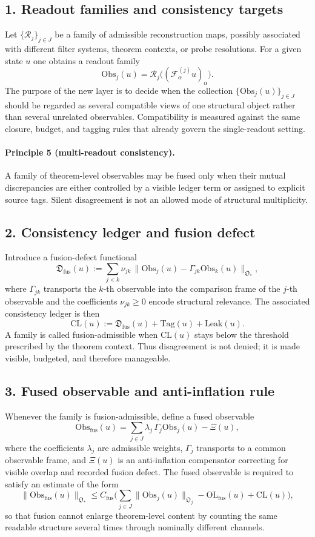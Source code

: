 \subsection*{1. Readout families and consistency targets}
Let $\{\mathcal R_j\}_{j\in J}$ be a family of admissible reconstruction maps,
possibly associated with different filter systems, theorem contexts, or probe
resolutions. For a given state $u$ one obtains a readout family
\[
\mathrm{Obs}_j(u)=\mathcal R_j\bigl((\mathcal F^{(j)}_\alpha u)_\alpha\bigr).
\]
The purpose of the new layer is to decide when the collection
$\{\mathrm{Obs}_j(u)\}_{j\in J}$ should be regarded as several compatible views of one
structural object rather than several unrelated observables. Compatibility is
measured against the same closure, budget, and tagging rules that already govern
the single-readout setting.

\paragraph{Principle 5 (multi-readout consistency).}
A family of theorem-level observables may be fused only when their mutual
discrepancies are either controlled by a visible ledger term or assigned to
explicit source tags. Silent disagreement is not an allowed mode of structural
multiplicity.

\subsection*{2. Consistency ledger and fusion defect}
Introduce a fusion-defect functional
\[
\mathfrak D_{\mathrm{fus}}(u)
:= \sum_{j<k}\nu_{jk}\,\|\mathrm{Obs}_j(u)-\Gamma_{jk}\mathrm{Obs}_k(u)\|_{\mathfrak O_*},
\]
where $\Gamma_{jk}$ transports the $k$-th observable into the comparison frame of the
$j$-th observable and the coefficients $\nu_{jk}\ge 0$ encode structural relevance.
The associated consistency ledger is then
\[
\mathrm{CL}(u):=\mathfrak D_{\mathrm{fus}}(u)+\mathrm{Tag}(u)+\mathrm{Leak}(u).
\]
A family is called fusion-admissible when $\mathrm{CL}(u)$ stays below the threshold
prescribed by the theorem context. Thus disagreement is not denied; it is made
visible, budgeted, and therefore manageable.

\subsection*{3. Fused observable and anti-inflation rule}
Whenever the family is fusion-admissible, define a fused observable
\[
\mathrm{Obs}_{\mathrm{fus}}(u)=\sum_{j\in J}\lambda_j\,\Gamma_j\mathrm{Obs}_j(u)-\Xi(u),
\]
where the coefficients $\lambda_j$ are admissible weights, $\Gamma_j$ transports to a
common observable frame, and $\Xi(u)$ is an anti-inflation compensator correcting
for visible overlap and recorded fusion defect. The fused observable is required
to satisfy an estimate of the form
\[
\|\mathrm{Obs}_{\mathrm{fus}}(u)\|_{\mathfrak O_*}
\le C_{\mathrm{fus}}
\bigl(
\sum_{j\in J}\|\mathrm{Obs}_j(u)\|_{\mathfrak O_j}
-\mathrm{OL}_{\mathrm{fus}}(u)
+\mathrm{CL}(u)
\bigr),
\]
so that fusion cannot enlarge theorem-level content by counting the same readable
structure several times through nominally different channels.

